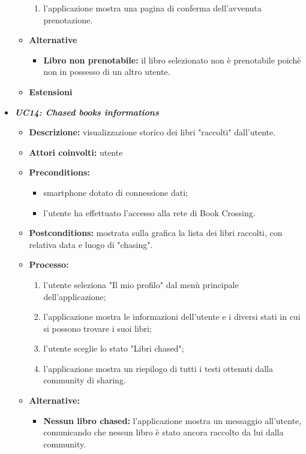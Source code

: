 \begin{itemize}
\begin{itemize}
\begin{enumerate}
			\item l'applicazione mostra una pagina di conferma dell'avvenuta prenotazione.
		\end{enumerate}
		\item \textbf{Alternative}
		\begin{itemize}
			\item \textbf{Libro non prenotabile:} il libro selezionato non è prenotabile poichè non in possesso di un altro utente.
		\end{itemize}
		\item \textbf{Estensioni}
	\end{itemize}
	\item \textbf{\textit{UC14: Chased books informations}}
	\begin{itemize}
		\item \textbf{Descrizione:} visualizzazione storico dei libri "raccolti" dall'utente.
		\item \textbf{Attori coinvolti:} utente
		\item \textbf{Preconditions:}
		\begin{itemize}
			\item smartphone dotato di connessione dati;
			\item l’utente ha effettuato l’accesso alla rete di Book Crossing.
		\end{itemize}
		\item \textbf{Postconditions:} mostrata sulla grafica la lista dei libri raccolti, con relativa data e luogo di "chasing".
		\item \textbf{Processo:}
		\begin{enumerate}
			\item l'utente seleziona "Il mio profilo" dal menù principale dell'applicazione;
			\item l'applicazione mostra le informazioni dell'utente e i diversi stati in cui si possono trovare i suoi libri;
			\item l'utente sceglie lo stato "Libri chased";
			\item l'applicazione mostra un riepilogo di tutti i testi ottenuti dalla community di sharing.
		\end{enumerate}
		\item \textbf{Alternative:}
		\begin{itemize}
			\item \textbf{Nessun libro chased:} l'applicazione mostra un messaggio all'utente, comunicando che nessun libro è stato ancora raccolto da lui dalla community.
		\end{itemize}

\end{itemize}
\end{itemize}
